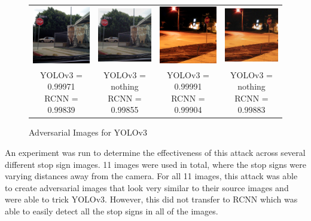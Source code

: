 \documentclass{article}
\begin{document}
\begin{figure}[h]
\begin{tabular}{c c@{\hskip 1cm} c c}
        \includegraphics[width=0.2\linewidth]{../test_images/stop3.png} &  \includegraphics[width=0.2\linewidth]{../test_images/adversarial_out/stop3.png} & 
        \includegraphics[width=0.2\linewidth]{../test_images/stop4.png} &  \includegraphics[width=0.2\linewidth]{../test_images/adversarial_out/stop4.png} \\

        \makecell[t]{YOLOv3 = 0.99971 \\ RCNN = 0.99839} & \makecell[t]{YOLOv3 = nothing \\ RCNN = 0.99855} & \makecell[t]{YOLOv3 = 0.99991 \\ RCNN = 0.99904} & \makecell[t]{YOLOv3 = nothing \\ RCNN = 0.99883} \\
    \end{tabular}
\caption{Adversarial Images for YOLOv3}
\label{fig:yoloadversarial}
\end{figure}

An experiment was run to determine the effectiveness of this attack across several different stop sign images. 11 images were used in total, where the stop signs were varying distances away from the camera. For all 11 images, this attack was able to create adversarial images that look very similar to their source images and were able to trick YOLOv3. However, this did not transfer to RCNN \cite{ren2016faster} which was able to easily detect all the stop signs in all of the images.
\end{document}
